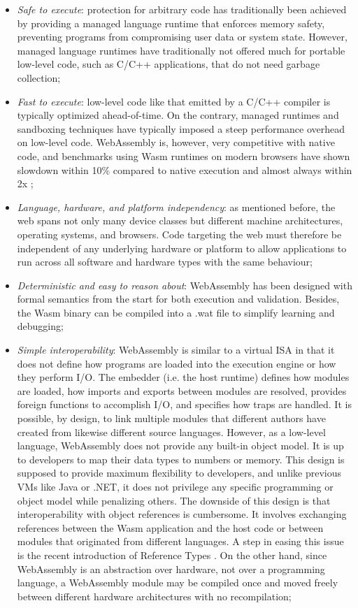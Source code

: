 \begin{itemize}
    \item \emph{Safe to execute}: protection for arbitrary code has traditionally been achieved by providing a managed language runtime that enforces memory safety, preventing programs from compromising user data or system state. However, managed language runtimes have traditionally not offered much for portable low-level code, such as C/C++ applications, that do not need garbage collection;
    \item \emph{Fast to execute}: low-level code like that emitted by a C/C++ compiler is typically optimized ahead-of-time. On the contrary, managed runtimes and sandboxing techniques have typically imposed a steep performance overhead on low-level code. WebAssembly is, however, very competitive with native code, and benchmarks using Wasm runtimes on modern browsers have shown slowdown within 10\% compared to native execution and almost always within 2x \cite{wasm};
    \item \emph{Language, hardware, and platform independency}: as mentioned before, the web spans not only many device classes but different machine architectures, operating systems, and browsers. Code targeting the web must therefore be independent of any underlying hardware or platform to allow applications to run across all software and hardware types with the same behaviour;
    \item \emph{Deterministic and easy to reason about}: WebAssembly has been designed with formal semantics from the start for both execution and validation. Besides, the Wasm binary can be compiled into a .wat file to simplify learning and debugging;
    \item \emph{Simple interoperability}: WebAssembly is similar to a virtual ISA in that it does not define how programs are loaded into the execution engine or how they perform I/O. The embedder (i.e. the host runtime) defines how modules are loaded, how imports and exports between modules are resolved, provides foreign functions to accomplish I/O, and specifies how traps are handled. It is possible, by design, to link multiple modules that different authors have created from likewise different source languages. However, as a low-level language, WebAssembly does not provide any built-in object model. It is up to developers to map their data types to numbers or memory. This design is supposed to provide maximum flexibility to developers, and unlike previous VMs like Java or .NET, it does not privilege any specific programming or object model while penalizing others. The downside of this design is that interoperability with object references is cumbersome. It involves exchanging references between the Wasm application and the host code or between modules that originated from different languages. A step in easing this issue is the recent introduction of Reference Types \cite{reference-types}. On the other hand, since WebAssembly is an abstraction over hardware, not over a programming language, a WebAssembly module may be compiled once and moved freely between different hardware architectures with no recompilation;

\end{itemize}
